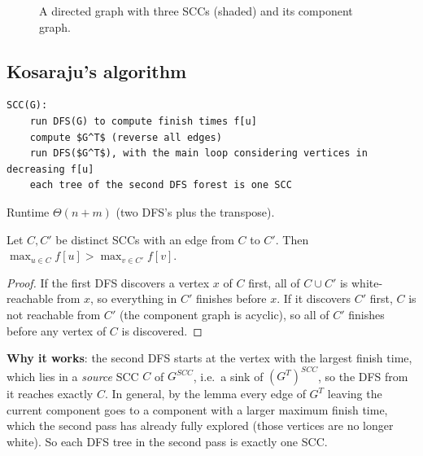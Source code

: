 \begin{figure}[H]
\centering
{}
\caption{A directed graph with three SCCs (shaded) and its component graph.}
\end{figure}

\subsection{Kosaraju's algorithm}
\begin{lstlisting}[style=pseudo]
SCC(G):
    run DFS(G) to compute finish times f[u]
    compute $G^T$ (reverse all edges)
    run DFS($G^T$), with the main loop considering vertices in decreasing f[u]
    each tree of the second DFS forest is one SCC
\end{lstlisting}
Runtime $\Theta(n+m)$ (two DFS's plus the transpose).

\begin{lemma}
Let $C,C'$ be distinct SCCs with an edge from $C$ to $C'$. Then $\max_{u\in C}f[u]>\max_{v\in C'}f[v]$.
\end{lemma}
\begin{proof}
If the first DFS discovers a vertex $x$ of $C$ first, all of $C\cup C'$ is white-reachable from $x$, so everything in $C'$ finishes before $x$.
If it discovers $C'$ first, $C$ is not reachable from $C'$ (the component graph is acyclic), so all of $C'$ finishes before any vertex of $C$ is discovered.
\end{proof}
\textbf{Why it works}: the second DFS starts at the vertex with the largest finish time, which lies in a \emph{source} SCC $C$ of $G^{SCC}$, i.e.\ a sink
of $(G^T)^{SCC}$, so the DFS from it reaches exactly $C$. In general, by the lemma every edge of $G^T$ leaving
the current component goes to a component with a larger maximum finish time, which the second pass has already fully explored (those vertices are no longer white). So each DFS tree in the second pass is
exactly one SCC.

